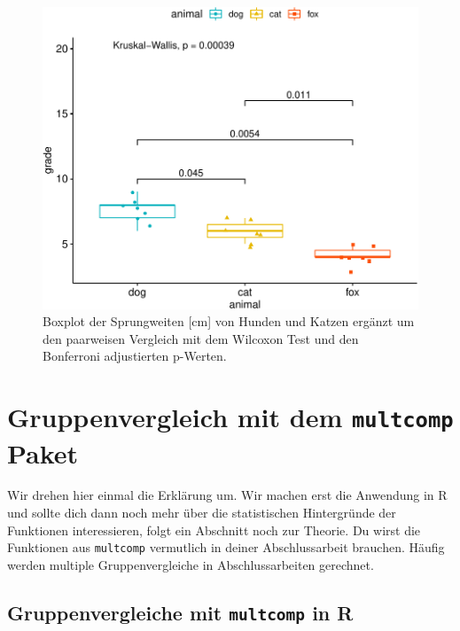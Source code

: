 \documentclass[
  letterpaper,
  DIV=11,
  oneside]{scrreport}
\begin{document}
\begin{figure}[H]

{\centering \includegraphics{./stat-tests-posthoc_files/figure-pdf/fig-ggpubr-2-1.pdf}

}

\caption{\label{fig-ggpubr-2}Boxplot der Sprungweiten {[}cm{]} von
Hunden und Katzen ergänzt um den paarweisen Vergleich mit dem Wilcoxon
Test und den Bonferroni adjustierten p-Werten.}

\end{figure}

\hypertarget{sec-posthoc-multcomp}{%
\section{\texorpdfstring{Gruppenvergleich mit dem \texttt{multcomp}
Paket}{Gruppenvergleich mit dem multcomp Paket}}\label{sec-posthoc-multcomp}}

Wir drehen hier einmal die Erklärung um. Wir machen erst die Anwendung
in R und sollte dich dann noch mehr über die statistischen Hintergründe
der Funktionen interessieren, folgt ein Abschnitt noch zur Theorie. Du
wirst die Funktionen aus \texttt{multcomp} vermutlich in deiner
Abschlussarbeit brauchen. Häufig werden multiple Gruppenvergleiche in
Abschlussarbeiten gerechnet.

\hypertarget{gruppenvergleiche-mit-multcomp-in-r}{%
\subsection{\texorpdfstring{Gruppenvergleiche mit \texttt{multcomp} in
R}{Gruppenvergleiche mit multcomp in R}}\label{gruppenvergleiche-mit-multcomp-in-r}}
\end{document}
